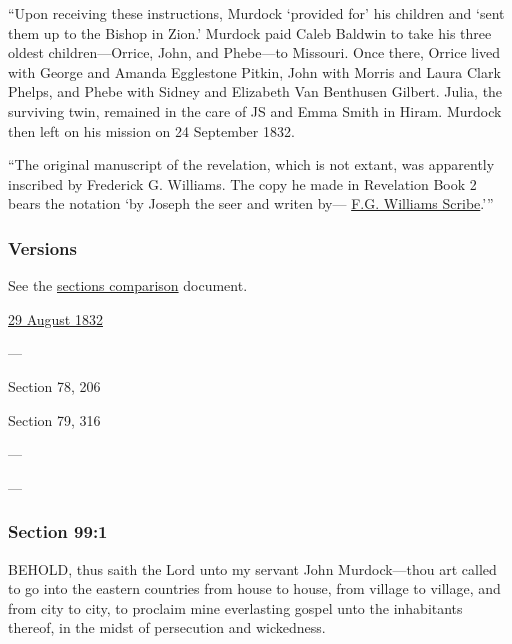 			``Upon receiving these instructions, Murdock `provided for' his children and `sent them up to the Bishop in Zion.' Murdock paid Caleb Baldwin to take his three oldest children---Orrice, John, and Phebe---to Missouri. Once there, Orrice lived with George and Amanda Egglestone Pitkin, John with Morris and Laura Clark Phelps, and Phebe with Sidney and Elizabeth Van Benthusen Gilbert. Julia, the surviving twin, remained in the care of JS and Emma Smith in Hiram. Murdock then left on his mission on 24 September 1832.
			
			``The original manuscript of the revelation, which is not extant, was apparently inscribed by Frederick G. Williams. The copy he made in Revelation Book 2 bears the notation `by Joseph the seer and writen by--- \uline{F.G. Williams Scribe}.'''
				
	\subsubsection{Versions}
		\label{DC99-V}
		
		See the \href{https://drive.google.com/file/d/1goAvNz8jS4R8slYfMG_db55Ty2z_vmgK/view?usp=sharing}{sections comparison} document.
	
		\begin{compactdesc}
			\item[JSP] \hyperref[EMS-1832-JS-29-AUG-1832]{29 August 1832}
			\item[BC] ---
			\item[DC 1835] Section 78, 206
			\item[DC 1844] Section 79, 316
			\item[TS] ---
			\item[MS] ---
		\end{compactdesc}

	\subsubsection{Section 99:1} %
		\label{DC99-1}

		BEHOLD, thus saith the Lord unto my servant John Murdock---thou art called to go into the eastern countries from house to house, from village to village, and from city to city, to proclaim mine everlasting gospel unto the inhabitants thereof, in the midst of persecution and wickedness.


